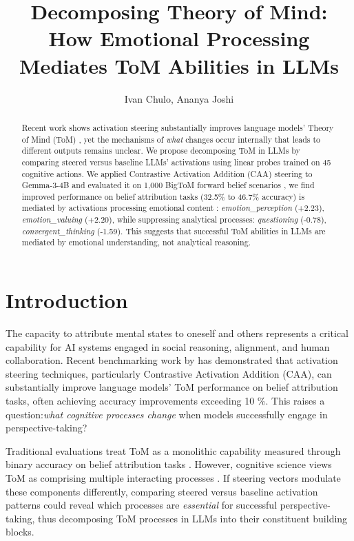 \documentclass[letterpaper]{article}
\title{Decomposing Theory of Mind: How Emotional Processing Mediates ToM Abilities in LLMs}
\author{
    Ivan Chulo, Ananya Joshi
}
\begin{document}
\maketitle

\begin{abstract}
Recent work shows activation steering substantially improves language models' Theory of Mind (ToM) \cite{Bortoletto2024}, yet the mechanisms of \textit{what} changes occur internally that leads to different outputs remains unclear. We propose decomposing ToM in LLMs by comparing steered versus baseline LLMs' activations using linear probes trained on 45 cognitive actions. We applied Contrastive Activation Addition (CAA) steering to Gemma-3-4B and evaluated it on 1,000 BigToM forward belief scenarios \cite{gandhi2023understanding}, we find improved performance on belief attribution tasks (32.5\% to 46.7\% accuracy) is mediated by activations processing emotional content : \textit{emotion\_perception} (+2.23), \textit{emotion\_valuing} (+2.20), while suppressing analytical processes: \textit{questioning} (-0.78), \textit{convergent\_thinking} (-1.59). This suggests that successful ToM abilities in LLMs are mediated by emotional understanding, not analytical reasoning.
\end{abstract}

\section{Introduction}

The capacity to attribute mental states to oneself and others represents a critical capability for AI systems engaged in social reasoning, alignment, and human collaboration. Recent benchmarking work by \citet{Bortoletto2024} has demonstrated that activation steering techniques, particularly Contrastive Activation Addition (CAA), can substantially improve language models' ToM performance on belief attribution tasks, often achieving accuracy improvements exceeding 10 \%. This raises a question:\textit{what cognitive processes change} when models successfully engage in perspective-taking?

Traditional evaluations treat ToM as a monolithic capability measured through binary accuracy on belief attribution tasks \cite{gandhi2023understanding}. However, cognitive science views ToM as comprising multiple interacting processes \cite{Gabriel2019}. If steering vectors modulate these components differently, comparing steered versus baseline activation patterns could reveal which processes are \textit{essential} for successful perspective-taking, thus decomposing ToM processes in LLMs into their constituent building blocks.
\end{document}
